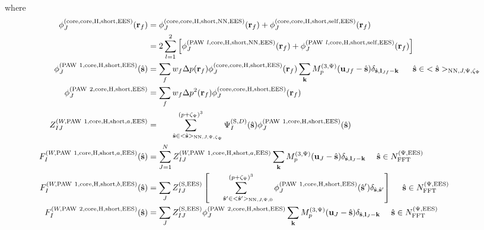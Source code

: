 \documentclass[paper=a4, fontsize=11pt]{article} %
\numberwithin{equation}{section} %
\numberwithin{figure}{section} %
\numberwithin{table}{section} %
\newcommand{\bu}{{\bf{u}}}
\newcommand{\bl}{{\bf{l}}}
\newcommand{\bk}{{\bf{k}}}
\newcommand{\bs}{{\bf{s}}}
\newcommand{\br}{{\bf{r}}}
\newcommand{\hs}{{\hat{\bf{s}}}}
\newcommand{\rS}{{\mathrm{S}}}
\newcommand{\rEES}{{\mathrm{EES}}}
\newcommand{\rcore}{{\mathrm{core}}}
\newcommand{\rNN}{{\mathrm{NN}}}
\newcommand{\rself}{{\mathrm{self}}}
\newcommand{\rshort}{{\mathrm{short}}}
\newcommand{\rP}{{\mathrm{PAW}}}
\newcommand{\rH}{{\mathrm{H}}}
\newcommand{\NFFTpEES}{{N^{\mathrm{(\Psi,\rEES})}_{\mathrm{FFT}}}}
\newcommand{\Mp}{{M_p^{(3,\Psi)}}}
\newcommand{\pzp}{{(p+\zeta_{\Psi})^3}}
\newcommand{\hsJp}{{<\hs>_{\rNN,J,\Psi,\zeta_\Psi}}}
\newcommand{\hsinJp}{{\ \ \ \ \ \hs  \in  \hsJp}}
\newcommand{\hspJpzr}{{<\hs'>_{\rNN,J,\Psi,0}}}
\newcommand{\hspinJpzr}{{\ \ \ \ \ \hs'  \in  \hspJpzr}}
\newcommand{\hsinpEES}{{\ \ \ \ \hs \in \NFFTpEES}}
\begin{document}
where
\begin{equation}
\begin{split}
\phi_J^{(\rcore,\rcore,\rH,\rshort,\rEES)}(\br_f) 
&= \phi_J^{(\rcore,\rcore,\rH,\rshort,\rNN,\rEES)}(\br_f) + \phi_J^{(\rcore,\rcore,\rH,\rshort,\rself,\rEES)}(\br_f) \\
&= 2\sum_{l=1}^2\left[\phi_J^{(\rP\ l,\rcore,\rH,\rshort,\rNN,\rEES)}(\br_f) + \phi_J^{(\rP\ l,\rcore,\rH,\rshort,\rself,\rEES)}(\br_f)\right]\\
\phi_J^{(\rP\ 1,\rcore,\rH,\rshort,\rEES)}(\hs) &= \sum_f w_f \Delta p(\br_f) \phi_J^{(\rcore,\rcore,\rH,\rshort,\rEES)}(\br_f) \sum_{\bk} \Mp(\bu_{Jf}-\hat \bs)\delta_{\hat \bs,\bl_{Jf}-\bk} \hsinJp \\
\phi_J^{(\rP\ 2,\rcore,\rH,\rshort,\rEES)} &= \sum_f w_f \Delta p^2(\br_f) \phi_J^{(\rcore,\rcore,\rH,\rshort,\rEES)}(\br_f) \\
Z_{IJ}^{(W,\rP\ 1,\rcore,\rH,\rshort,a,\rEES)} &= \sum_{\hsinJp}^\pzp \Psi_{I}^{(\rS,D)}(\hat \bs) \phi_J^{(\rP\ 1,\rcore,\rH,\rshort,\rEES)}(\hs) \\
F_I^{(W,\rP\ 1,\rcore,\rH,\rshort,a,\rEES)}(\hs) &= \sum_{J=1}^N Z_{IJ}^{(W,\rP\ 1,\rcore,\rH,\rshort,a,\rEES)}\sum_{\bk} \Mp(\bu_{J}-\hat \bs) \delta_{\hat \bs,\bl_J-\bk} \hsinpEES \\
F_I^{(W,\rP\ 1,\rcore,\rH,\rshort,b,\rEES)}(\hs) &=\sum_J Z_{IJ}^{(\rS,\rEES)}  \left[ \sum_{\hspinJpzr}^\pzp \phi_J^{(\rP\ 1,\rcore,\rH,\rshort,\rEES)}(\hs')\delta_{\hs,\hs'}\right] \hsinpEES \\
F_I^{(W,\rP\ 2,\rcore,\rH,\rshort,\rEES)}(\hs) &= \sum_J Z_{IJ}^{(\rS,\rEES)} \phi_J^{(\rP\ 2,\rcore,\rH,\rshort,\rEES)}  \sum_{\bk}  \Mp(\bu_{J}-\hat \bs)\delta_{\hat \bs,\bl_J-\bk} \hsinpEES \\
\end{split}
\end{equation}
\end{document}
